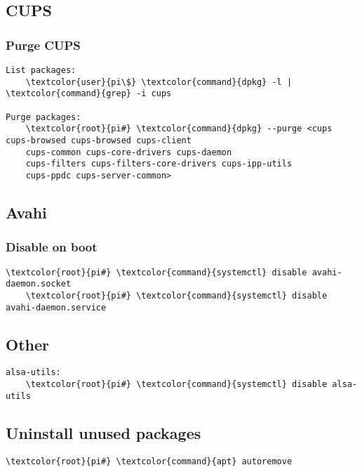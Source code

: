 \documentclass[10pt, a4paper, onecolumn, openany]{book} %
\begin{document}
\subsection{CUPS}
\subsubsection{Purge CUPS}
\begin{Verbatim}[commandchars=\\\{\}]
List packages:
    \textcolor{user}{pi\$} \textcolor{command}{dpkg} -l | \textcolor{command}{grep} -i cups

Purge packages:
    \textcolor{root}{pi#} \textcolor{command}{dpkg} --purge <cups cups-browsed cups-browsed cups-client 
    cups-common cups-core-drivers cups-daemon 
    cups-filters cups-filters-core-drivers cups-ipp-utils 
    cups-ppdc cups-server-common>
\end{Verbatim}

\subsection{Avahi}
\subsubsection{Disable on boot}
\begin{Verbatim}[commandchars=\\\{\}]
    \textcolor{root}{pi#} \textcolor{command}{systemctl} disable avahi-daemon.socket 
    \textcolor{root}{pi#} \textcolor{command}{systemctl} disable avahi-daemon.service
\end{Verbatim}

\subsection{Other}
\begin{Verbatim}[commandchars=\\\{\}]
alsa-utils:
    \textcolor{root}{pi#} \textcolor{command}{systemctl} disable alsa-utils 
\end{Verbatim}

\subsection{Uninstall unused packages}
\begin{Verbatim}[commandchars=\\\{\}]
    \textcolor{root}{pi#} \textcolor{command}{apt} autoremove 
\end{Verbatim}
\end{document}
